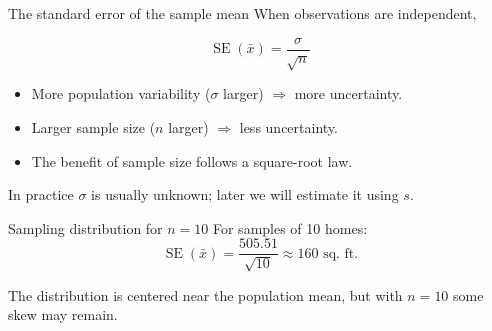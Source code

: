 \documentclass[11pt,aspectratio=169]{beamer}
\newcommand{\SE}{\operatorname{SE}}
\begin{document}
\begin{frame}{The standard error of the sample mean}
When observations are independent,

\[
\boxed{\SE(\bar{x})=\frac{\sigma}{\sqrt{n}}}
\]

\begin{itemize}
  \item More population variability ($\sigma$ larger) $\Rightarrow$ more uncertainty.
  \item Larger sample size ($n$ larger) $\Rightarrow$ less uncertainty.
  \item The benefit of sample size follows a \alert{square-root law}.
\end{itemize}

\vfill
In practice $\sigma$ is usually unknown; later we will estimate it using $s$.
\end{frame}

\begin{frame}{Sampling distribution for $n=10$}
For samples of 10 homes:
\[
\SE(\bar{x})=\frac{505.51}{\sqrt{10}}\approx160\text{ sq. ft.}
\]

\begin{center}
\end{center}

\vspace{-0.4em}
The distribution is centered near the population mean, but with $n=10$ some skew may remain.
\end{frame}
\end{document}
